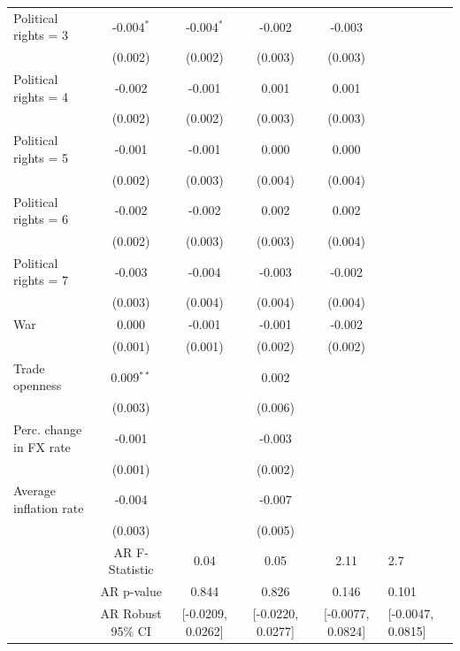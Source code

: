 \begin{table}[htbp]
\begin{tabular}{lcccc}
      Political rights = 3       & -0.004$^{*}$ & -0.004$^{*}$ & -0.002   & -0.003\\   
                                 & (0.002)      & (0.002)      & (0.003)  & (0.003)\\   
      Political rights = 4       & -0.002       & -0.001       & 0.001    & 0.001\\   
                                 & (0.002)      & (0.002)      & (0.003)  & (0.003)\\   
      Political rights = 5       & -0.001       & -0.001       & 0.000    & 0.000\\   
                                 & (0.002)      & (0.003)      & (0.004)  & (0.004)\\   
      Political rights = 6       & -0.002       & -0.002       & 0.002    & 0.002\\   
                                 & (0.002)      & (0.003)      & (0.003)  & (0.004)\\   
      Political rights = 7       & -0.003       & -0.004       & -0.003   & -0.002\\   
                                 & (0.003)      & (0.004)      & (0.004)  & (0.004)\\   
      War                        & 0.000        & -0.001       & -0.001   & -0.002\\   
                                 & (0.001)      & (0.001)      & (0.002)  & (0.002)\\   
      Trade openness             & 0.009$^{**}$ &              & 0.002    &   \\   
                                 & (0.003)      &              & (0.006)  &   \\   
      Perc. change in FX rate    & -0.001       &              & -0.003   &   \\   
                                 & (0.001)      &              & (0.002)  &   \\   
      Average inflation rate     & -0.004       &              & -0.007   &   \\   
                                 & (0.003)      &              & (0.005)  &   \\   
        & AR F-Statistic & 0.04 & 0.05 & 2.11 & 2.7\\
         & AR p-value & 0.844 & 0.826 & 0.146 & 0.101\\
          & AR Robust 95\% CI & [-0.0209, 0.0262] & [-0.0220, 0.0277] & [-0.0077, 0.0824] & [-0.0047, 0.0815]\\

\end{tabular}
\end{table}
